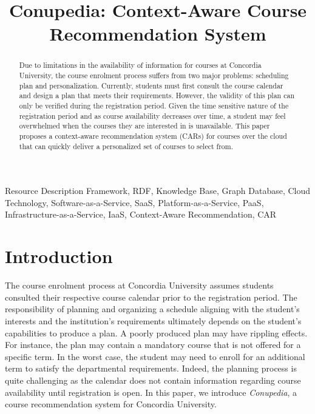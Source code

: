\documentclass[conference]{IEEEtran}
\begin{document}
\title{Conupedia: Context-Aware Course Recommendation System \\
}

\author{
}

\maketitle

\begin{abstract}
Due to limitations in the availability of information for courses at Concordia University, the course enrolment process suffers from two major problems: scheduling plan and personalization.
Currently, students must first consult the course calendar and design a plan that meets their requirements.
However, the validity of this plan can only be verified during the registration period.
Given the time sensitive nature of the registration period and as course availability decreases over time, a student may feel overwhelmed when the courses they are interested in is unavailable.
This paper proposes a context-aware recommendation system (CARs) for courses over the cloud that can quickly deliver a personalized set of courses to select from.

\end{abstract}

\begin{IEEEkeywords}
Resource Description Framework, RDF, Knowledge Base, Graph Database, Cloud Technology, Software-as-a-Service, SaaS, Platform-as-a-Service, PaaS, Infrastructure-as-a-Service, IaaS, Context-Aware Recommendation, CAR
\end{IEEEkeywords}

\section{Introduction}
    The course enrolment process at Concordia University assumes students consulted their respective course calendar prior to the registration period. 
    The responsibility of planning and organizing a schedule aligning with the student’s interests and the institution’s requirements ultimately depends on the student’s capabilities to produce a plan. 
    A poorly produced plan may have rippling effects. 
    For instance, the plan may contain a mandatory course that is not offered for a specific term. In the worst case, the student may need to enroll for an additional term to satisfy the departmental requirements. 
    Indeed, the planning process is quite challenging as the calendar does not contain information regarding course availability until registration is open. 
    In this paper, we introduce \textit{Conupedia}, a course recommendation system for Concordia University.
\end{document}
